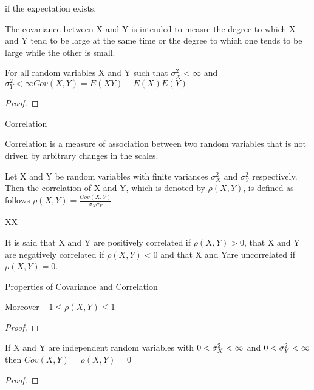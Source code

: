 if the expectation exists.

The covariance between X and Y is intended to measre the degree to which X and Y tend to be large at the same time or the degree to which one tends to be large while the other is small.

\begin{proposition}
For all random variables X and Y such that $\sigma_{X}^{2}<\infty$ and $\sigma_{Y}^{2}<\infty Cov\left(X,Y\right)=E\left(XY\right)-E\left(X\right)E\left(Y\right)$
\end{proposition}
\begin{proof}
\end{proof}

Correlation

Correlation is a measure of association between two random variables that is not driven by arbitrary changes in the scales.

\begin{definition}
Let X and Y be random variables with finite variances $\sigma_{X}^{2}$ and $\sigma_{Y}^{2}$ respectively. Then the correlation of X and Y, which is denoted by $\rho\left(X,Y\right)$, is defined as follows $\rho\left(X,Y\right)=\frac{Cov\left(X,Y\right)}{\sigma_{X}\sigma_{Y}}$
\end{definition}

XX

\begin{definition}
It is said that X and Y are positively correlated if $\rho\left(X,Y\right)>0$, that X and Y are negatively correlated if $\rho\left(X,Y\right)<0$ and that X and Yare uncorrelated if $\rho\left(X,Y\right)=0$.
\end{definition}

Properties of Covariance and Correlation

\begin{proposition}
Moreover $-1 \leq \rho\left(X,Y\right) \leq 1$
\end{proposition}
\begin{proof}
\end{proof}

\begin{proposition}
If X and Y are independent random variables with $0<\text{\ensuremath{\sigma_{X}^{2}}}<\infty$ and $0<\text{\ensuremath{\sigma_{Y}^{2}}}<\infty$ then $Cov\left(X,Y\right)=\rho\left(X,Y\right)=0$
\end{proposition}
\begin{proof}
\end{proof}

